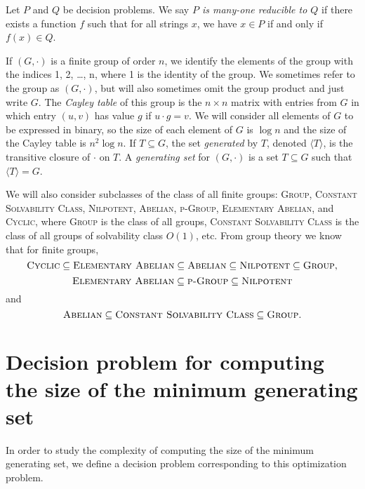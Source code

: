 \documentclass{article}
\newcommand{\gen}[1]{{\langle #1 \rangle}}
\begin{document}
Let $P$ and $Q$ be decision problems.
We say \emph{$P$ is many-one reducible to $Q$} if there exists a function $f$ such that for all strings $x$, we have $x \in P$ if and only if $f(x) \in Q$.

If $(G, \cdot)$ is a finite group of order $n$, we identify the elements of the group with the indices 1, 2, \ldots, n, where 1 is the identity of the group.
We sometimes refer to the group as $(G, \cdot)$, but will also sometimes omit the group product and just write $G$.
The \emph{Cayley table} of this group is the $n \times n$ matrix with entries from $G$ in which entry $(u, v)$ has value $g$ if $u \cdot g = v$.
We will consider all elements of $G$ to be expressed in binary, so the size of each element of $G$ is $\log n$ and the size of the Cayley table is $n^2 \log n$.
If $T \subseteq G$, the set \emph{generated} by $T$, denoted $\gen{T}$, is the transitive closure of $\cdot$ on $T$.
A \emph{generating set} for $(G, \cdot)$ is a set $T \subseteq G$ such that $\gen{T} = G$.

We will also consider subclasses of the class of all finite groups: \textsc{Group}, \textsc{Constant Solvability Class}, \textsc{Nilpotent}, \textsc{Abelian}, \textsc{p-Group}, \textsc{Elementary Abelian}, and \textsc{Cyclic}, where \textsc{Group} is the class of all groups, \textsc{Constant Solvability Class} is the class of all groups of solvability class $O(1)$, etc.
From group theory we know that for finite groups,
\begin{equation*}
  \textsc{Cyclic} \subseteq \textsc{Elementary Abelian} \subseteq \textsc{Abelian} \subseteq \textsc{Nilpotent} \subseteq \textsc{Group},
\end{equation*}
\begin{equation*}
  \textsc{Elementary Abelian} \subseteq \textsc{p-Group} \subseteq \textsc{Nilpotent}
\end{equation*}
and
\begin{equation*}
  \textsc{Abelian} \subseteq \textsc{Constant Solvability Class} \subseteq \textsc{Group}.
\end{equation*}

\section{Decision problem for computing the size of the minimum generating set}

In order to study the complexity of computing the size of the minimum generating set, we define a decision problem corresponding to this optimization problem.
\end{document}

